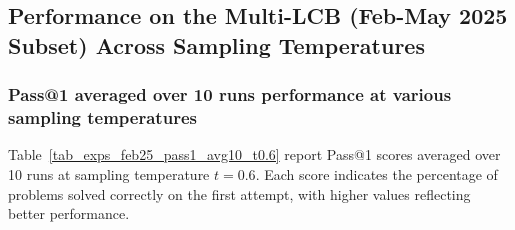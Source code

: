 \documentclass{llmxive}
\begin{document}
\subsection{Performance on the Multi-LCB (Feb-May 2025 Subset) Across Sampling Temperatures}


\subsubsection{Pass@1 averaged over 10 runs performance at various sampling temperatures}

Table~\ref{tab_exps_feb25_pass1_avg10_t0.6} report Pass@1 scores averaged over 10 runs at sampling temperature $t=0.6$. Each score indicates the percentage of problems solved correctly on the first attempt, with higher values reflecting better performance. 
\end{document}

